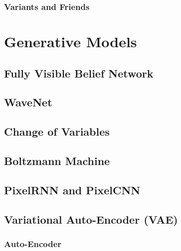 		\subsection{Variants and Friends} %

\chapter{Generative Models} %

	\section{Fully Visible Belief Network} %

	\section{WaveNet} %

	\section{Change of Variables} %

	\section{Boltzmann Machine} %

	\section{PixelRNN and PixelCNN} %

	\section{Variational Auto-Encoder (VAE)} %

		\subsection{Auto-Encoder} %

